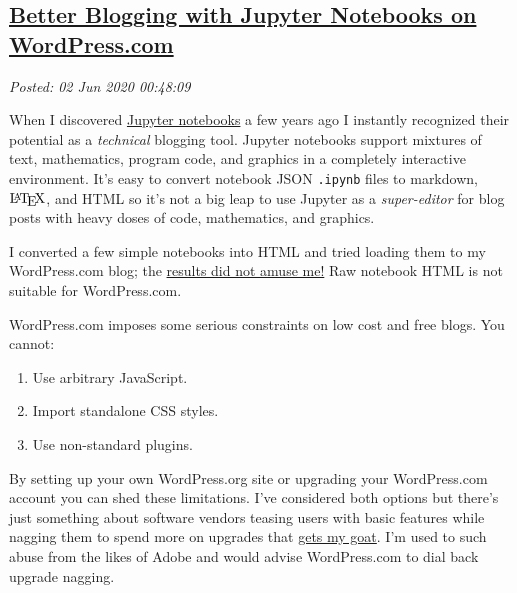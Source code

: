 %  
    
\subsection*{\href{https://analyzethedatanotthedrivel.org/2020/06/01/better-blogging-with-jupyter-notebooks-on-wordpress-com/}{Better Blogging with Jupyter Notebooks on WordPress.com}}


\noindent\emph{Posted: 02 Jun 2020 00:48:09}
\vspace{6pt}
    
    When I discovered \href{https://jupyter.org/}{Jupyter notebooks} a few
years ago I instantly recognized their potential as a \emph{technical}
blogging tool. Jupyter notebooks support mixtures of text, mathematics,
program code, and graphics in a completely interactive environment. It's
easy to convert notebook JSON \texttt{.ipynb} files to markdown,
\(\LaTeX\), and HTML so it's not a big leap to use Jupyter as a
\emph{super-editor} for blog posts with heavy doses of code,
mathematics, and graphics.

I converted a few simple notebooks into HTML and tried loading them to
my WordPress.com blog; the
\href{https://analyzethedatanotthedrivel.org/2017/12/24/downloading-smugmug-captions-with-python-and-jupyter/}{results
did not amuse me!} Raw notebook HTML is not suitable for WordPress.com.

WordPress.com imposes some serious constraints on low cost and free
blogs. You cannot:

\begin{enumerate}
\def\labelenumi{\arabic{enumi}.}
\tightlist
\item
  Use arbitrary JavaScript.
\item
  Import standalone CSS styles.
\item
  Use non-standard plugins.
\end{enumerate}

By setting up your own WordPress.org site or upgrading your
WordPress.com account you can shed these limitations. I've considered
both options but there's just something about software vendors teasing
users with basic features while nagging them to spend more on upgrades
that
\href{https://www.wisegeek.com/what-does-gets-my-goat-mean.htm}{gets my
goat}. I'm used to such abuse from the likes of Adobe and would advise
WordPress.com to dial back upgrade nagging.

